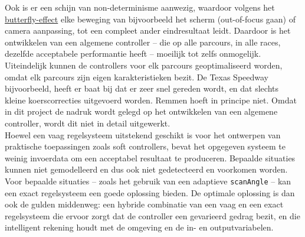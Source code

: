 \documentclass[10pt,a4paper]{article}
\begin{document}
			Ook is er een schijn van non-determinisme aanwezig, waardoor volgens het \href{https://en.wikipedia.org/wiki/Butterfly_effect}{butterfly-effect} elke beweging van bijvoorbeeld het scherm (out-of-focus gaan) of camera aanpassing, tot een compleet ander eindresultaat leidt. Daardoor is het ontwikkelen van een algemene controller -- die op alle parcours, in alle races, dezelfde acceptabele performantie heeft -- moeilijk tot zelfs onmogelijk.\\

			Uiteindelijk kunnen de controllers voor elk parcours geoptimaliseerd worden, omdat elk parcours zijn eigen karakteristieken bezit. De Texas Speedway bijvoorbeeld, heeft er baat bij dat er zeer snel gereden wordt, en dat slechts kleine koerscorrecties uitgevoerd worden. Remmen hoeft in principe niet. Omdat in dit project de nadruk wordt gelegd op het ontwikkelen van een algemene controller, wordt dit niet in detail uitgewerkt.\\

			Hoewel een vaag regelsysteem uitstekend geschikt is voor het ontwerpen van praktische toepassingen zoals soft controllers, bevat het opgegeven systeem te weinig invoerdata om een acceptabel resultaat te produceren. Bepaalde situaties kunnen niet gemodelleerd en dus ook niet gedetecteerd en voorkomen worden. Voor bepaalde situaties -- zoals het gebruik van een adaptieve \texttt{scanAngle} -- kan een exact regelsysteem een goede oplossing bieden. De optimale oplossing is dan ook de gulden middenweg: een hybride combinatie van een vaag en een exact regelsysteem die ervoor zorgt dat de controller een gevarieerd gedrag bezit, en die intelligent rekening houdt met de omgeving en de in- en outputvariabelen.
\end{document}
